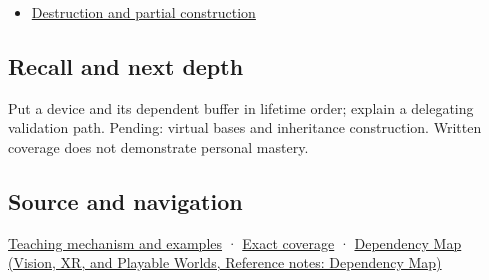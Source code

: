 \hypertarget{appendix-3cb49709605a-used-by}{}

\begin{itemize}
\tightlist
\item
  \hyperref[appendix-9bfe377cef7a]{Destruction and partial construction}
\end{itemize}

\subsection{Recall and next depth}\label{appendix-3cb49709605a-recall-and-next-depth}

\hypertarget{appendix-3cb49709605a-recall-and-next-depth}{}

Put a device and its dependent buffer in lifetime order; explain a delegating validation path. Pending: virtual bases and inheritance construction. Written coverage does not demonstrate personal mastery.

\subsection{Source and navigation}\label{appendix-3cb49709605a-source-and-navigation}

\hypertarget{appendix-3cb49709605a-source-and-navigation}{}

\hyperref[01-foundations-i-ch003-construction-order-records-lifetime-dependencies]{Teaching mechanism and examples} · \hyperref[appendix-fd090d982a15-m009---parts-127-147]{Exact coverage} · \href{../07-Vision-XR-and-Playable-Worlds/main.pdf\#nameddest=appendix-4ad47bdd269a}{Dependency Map (Vision, XR, and Playable Worlds, Reference notes: Dependency Map)}
